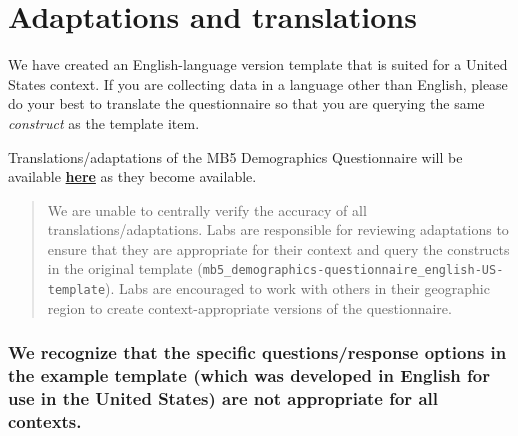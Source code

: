 \documentclass[
  letterpaper,
  DIV=11,
  numbers=noendperiod,
  oneside]{scrreprt}
\begin{document}

\section{Adaptations and
translations}\label{adaptations-and-translations}

We have created an English-language version template that is suited for
a United States context. If you are collecting data in a language other
than English, please do your best to translate the questionnaire so that
you are querying the same \emph{construct} as the template item.

\begin{tcolorbox}[enhanced jigsaw, coltitle=black, colframe=quarto-callout-note-color-frame, titlerule=0mm, colback=white, arc=.35mm, toprule=.15mm, left=2mm, colbacktitle=quarto-callout-note-color!10!white, opacityback=0, bottomtitle=1mm, title=\textcolor{quarto-callout-note-color}{\faInfo}\hspace{0.5em}{MB5 Demographics Questionnaire directory}, breakable, rightrule=.15mm, opacitybacktitle=0.6, toptitle=1mm, leftrule=.75mm, bottomrule=.15mm]

Translations/adaptations of the MB5 Demographics Questionnaire will be
available
\href{https://drive.google.com/drive/folders/13ehUECKUy2BVtIlbTfMYIDbrVXxmSqR4?usp=drive_link}{\textbf{here}}
as they become available.\footnotemark{}

\begin{quote}
We are unable to centrally verify the accuracy of all
translations/adaptations. Labs are responsible for reviewing adaptations
to ensure that they are appropriate for their context and query the
constructs in the original template
(\texttt{mb5\_demographics-questionnaire\_english-US-template}). Labs
are encouraged to work with others in their geographic region to create
context-appropriate versions of the questionnaire.
\end{quote}

\end{tcolorbox}


\subsubsection{We recognize that the specific questions/response options
in the example template (which was developed in English for use in the
United States) are not appropriate for all
contexts.}\label{we-recognize-that-the-specific-questionsresponse-options-in-the-example-template-which-was-developed-in-english-for-use-in-the-united-states-are-not-appropriate-for-all-contexts.}
\end{document}
